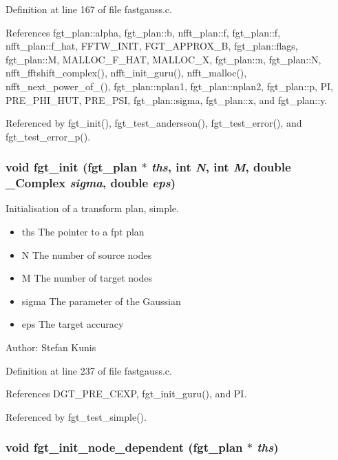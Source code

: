 Definition at line 167 of file fastgauss.c.

References fgt\_\-plan::alpha, fgt\_\-plan::b, nfft\_\-plan::f, fgt\_\-plan::f, nfft\_\-plan::f\_\-hat, FFTW\_\-INIT, FGT\_\-APPROX\_\-B, fgt\_\-plan::flags, fgt\_\-plan::M, MALLOC\_\-F\_\-HAT, MALLOC\_\-X, fgt\_\-plan::n, fgt\_\-plan::N, nfft\_\-fftshift\_\-complex(), nfft\_\-init\_\-guru(), nfft\_\-malloc(), nfft\_\-next\_\-power\_\-of\_(), fgt\_\-plan::nplan1, fgt\_\-plan::nplan2, fgt\_\-plan::p, PI, PRE\_\-PHI\_\-HUT, PRE\_\-PSI, fgt\_\-plan::sigma, fgt\_\-plan::x, and fgt\_\-plan::y.

Referenced by fgt\_\-init(), fgt\_\-test\_\-andersson(), fgt\_\-test\_\-error(), and fgt\_\-test\_\-error\_\-p().\hypertarget{group__applications__fastgauss_g44cf9a6fb0a16df875f613f343fd5c65}{
\subsubsection{\setlength{\rightskip}{0pt plus 5cm}void fgt\_\-init ({\bf fgt\_\-plan} $\ast$ {\em ths}, int {\em N}, int {\em M}, double \_\-Complex {\em sigma}, double {\em eps})}}
\label{group__applications__fastgauss_g44cf9a6fb0a16df875f613f343fd5c65}


Initialisation of a transform plan, simple. 

\begin{itemize}
\item ths The pointer to a fpt plan \item N The number of source nodes \item M The number of target nodes \item sigma The parameter of the Gaussian \item eps The target accuracy\end{itemize}
\begin{Desc}
\item[Author:]Stefan Kunis \end{Desc}


Definition at line 237 of file fastgauss.c.

References DGT\_\-PRE\_\-CEXP, fgt\_\-init\_\-guru(), and PI.

Referenced by fgt\_\-test\_\-simple().\hypertarget{group__applications__fastgauss_g9d8f6229d33bc49f618838b21b3dd7fc}{
\subsubsection{\setlength{\rightskip}{0pt plus 5cm}void fgt\_\-init\_\-node\_\-dependent ({\bf fgt\_\-plan} $\ast$ {\em ths})}}
\label{group__applications__fastgauss_g9d8f6229d33bc49f618838b21b3dd7fc}


